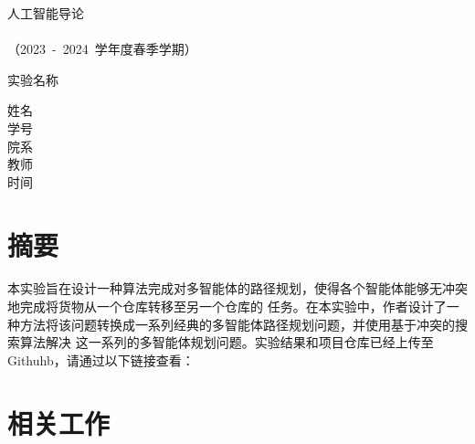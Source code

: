 \documentclass[UTF8]{ctexart}  %
\begin{document}
\begin{titlepage} %
        \heiti
        \vspace*{100pt}
        \begin{center}
            \fontsize{48pt}{0} 人\quad 工\quad 智\quad 能\quad 导\quad 论\\
            \vspace*{36pt}
            \\
            \vspace*{48pt}
            \LARGE（2023\ -\ 2024\ 学年度\qquad 春季学期）\\
            \vspace*{48pt}

            \LARGE 实验名称\ \ \underline{}\\
            \vspace*{72pt}

            \heiti\Large 姓名\ \ \underline{}\\
            \heiti\Large 学号\ \ \underline{}\\
            \heiti\Large 院系\ \ \underline{}\\
            \heiti\Large 教师\ \ \underline{}\\
			\heiti\Large 时间\ \ \underline{}\\
        \end{center}
\end{titlepage}

\tableofcontents %
\thispagestyle{empty}

\newpage %
\section{摘要}
本实验旨在设计一种算法完成对多智能体的路径规划，使得各个智能体能够无冲突地完成将货物从一个仓库转移至另一个仓库的
任务。在本实验中，作者设计了一种方法将该问题转换成一系列经典的多智能体路径规划问题，并使用基于冲突的搜索算法解决
这一系列的多智能体规划问题。实验结果和项目仓库已经上传至Githuhb，请通过以下链接查看：




\section{相关工作}
\end{document}
